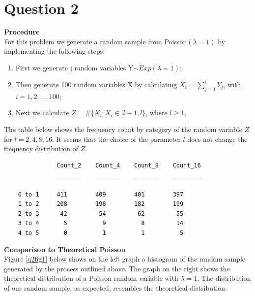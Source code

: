 \documentclass[12pt,a4paper]{article}
\begin{document}
\section*{Question 2}
\textbf{Procedure}\\
For this problem we generate a random sample from Poisson$(\lambda=1)$ by implementing the following steps:
\begin{enumerate}
\item{First we generate j random variables Y$\sim Exp(\lambda=1)$;}
\item{Then generate 100 random variables X by calculating $X_i=\sum_{j=1}^iY_j$, with $i = 1, 2, ..., 100$;}
\item{Next we calculate $Z = \#\{X_i : X_i \in [l-1,l\}$, where $l\geq1$.}
\end{enumerate}
The table below shows the frequency count by category of the random variable $Z$ for $l = 2,4,8,16$. It seems that the choice of the parameter $l$ does not change the frequency distribution of $Z$.

\begin{verbatim}
               Count_2    Count_4    Count_8    Count_16
               _______    _______    _______    ________

    0 to 1     411        409        401        397     
    1 to 2     208        198        182        199     
    2 to 3      42         54         62         55     
    3 to 4       5          9          8         14     
    4 to 5       0          1          1          5    

\end{verbatim}

\textbf{Comparison to Theoretical Poisson}\\
Figure \ref{q2fig1} below shows on the left graph a histogram of the random sample generated by the process outlined above. The graph on the right shows the theoretical distribution of a Poisson random variable with $\lambda=1$. The distribution of our random sample, as expected, resembles the theoretical distribution.
\end{document}
